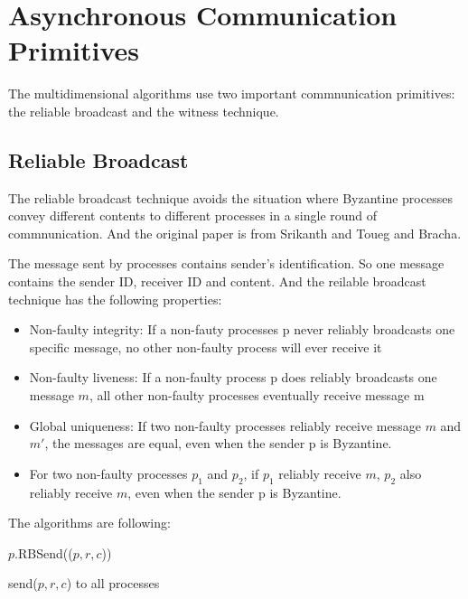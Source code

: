 \section{Asynchronous Communication Primitives}

The multidimensional algorithms use two important commnunication
primitives: the reliable broadcast and the witness technique.

\subsection{Reliable Broadcast}


The reliable broadcast technique avoids the situation where Byzantine
processes convey different contents to different processes in a single
round of commnunication.  And the original paper is from Srikanth and 
Toueg\cite{srikanth1987simulating} and Bracha\cite{bracha1987asynchronous}.

The message sent by processes contains sender's identification. So 
one message contains the sender ID, receiver ID and content. And the reilable
broadcast technique has the following properties:

\begin{itemize}

    \item Non-faulty integrity: If a non-fauty processes p never reliably broadcasts one specific
    message, no other non-faulty process will ever receive it

    \item Non-faulty liveness: If a non-faulty process p does reliably broadcasts one message $m$, 
    all other non-faulty processes eventually receive message m

    \item Global uniqueness: If two non-faulty processes reliably receive message $m$ and $m\prime$,
    the messages are equal, even when the sender p is Byzantine.
    
    \item For two non-faulty processes $p_1$ and $p_2$, if $p_1$ reliably receive $m$, $p_2$ also
    reliably receive $m$, even when the sender p is Byzantine.
\end{itemize}

The algorithms are following:

\begin{algorithm}
\caption{$p$.RBSend(($p,r,c$))}
send($p, r, c$) to all processes

\end{algorithm}

